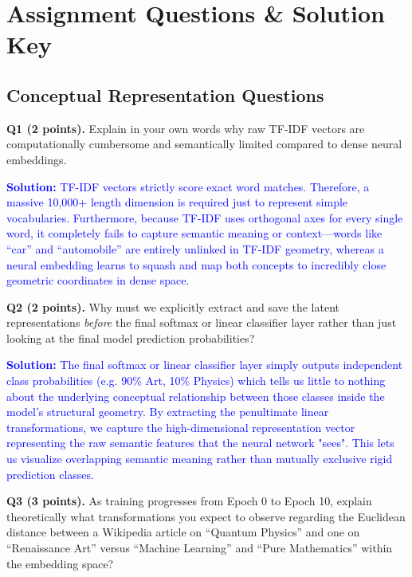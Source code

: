 \documentclass[11pt]{article}
\begin{document}
\clearpage
\section{Assignment Questions \& Solution Key}

\subsection{Conceptual Representation Questions}

\textbf{Q1 (2 points).} Explain in your own words why raw TF-IDF vectors are computationally cumbersome and semantically limited compared to dense neural embeddings. 

\textcolor{blue}{\textbf{Solution:} TF-IDF vectors strictly score exact word matches. Therefore, a massive 10,000+ length dimension is required just to represent simple vocabularies. Furthermore, because TF-IDF uses orthogonal axes for every single word, it completely fails to capture semantic meaning or context—words like ``car'' and ``automobile'' are entirely unlinked in TF-IDF geometry, whereas a neural embedding learns to squash and map both concepts to incredibly close geometric coordinates in dense space.}
\vspace{0.75cm}

\textbf{Q2 (2 points).} Why must we explicitly extract and save the latent representations \textit{before} the final softmax or linear classifier layer rather than just looking at the final model prediction probabilities?

\textcolor{blue}{\textbf{Solution:} The final softmax or linear classifier layer simply outputs independent class probabilities (e.g. 90\% Art, 10\% Physics) which tells us little to nothing about the underlying conceptual relationship between those classes inside the model's structural geometry. By extracting the penultimate linear transformations, we capture the high-dimensional representation vector representing the raw semantic features that the neural network "sees". This lets us visualize overlapping semantic meaning rather than mutually exclusive rigid prediction classes.}
\vspace{0.75cm}

\textbf{Q3 (3 points).} As training progresses from Epoch 0 to Epoch 10, explain theoretically what transformations you expect to observe regarding the Euclidean distance between a Wikipedia article on ``Quantum Physics'' and one on ``Renaissance Art'' versus ``Machine Learning'' and ``Pure Mathematics'' within the embedding space?
\end{document}
